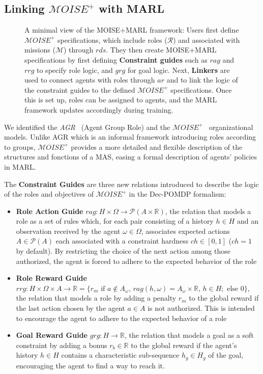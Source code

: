 \documentclass[sigconf,anonymous]{aamas}
\begin{document}
\subsection{Linking $\mathcal{M}OISE^+$ with MARL}

\begin{figure}[h!]
    \centering
    
    \caption{A minimal view of the MOISE+MARL framework: 
    Users first define $\mathcal{M}OISE^+$ specifications, which include roles ($\mathcal{R}$) and associated with missions ($\mathcal{M}$) through $rds$. They then create MOISE+MARL specifications by first defining \textbf{Constraint guides} such as $rag$ and $rrg$ to specify role logic, and $grg$ for goal logic. 
    Next, \textbf{Linkers} are used to connect agents with roles through $ar$ and to link the logic of the constraint guides to the defined $\mathcal{M}OISE^+$ specifications. Once this is set up, roles can be assigned to agents, and the MARL framework updates accordingly during training.
    }
    \label{fig:mm_synthesis}
\end{figure}

We identified the \textit{AGR}~\cite{ferber2003} (Agent Group Role) and the $\mathcal{M}OISE^+$~\citep{Hubner2007} organizational models. Unlike AGR which is an informal framework introducing roles according to groups, $\mathcal{M}OISE^+$ provides a more detailed and flexible description of the structures and fonctions of a MAS, easing a formal description of agents' policies in MARL.

\noindent The \textbf{Constraint Guides} are three new relations introduced to describe the logic of the roles and objectives of $\mathcal{M}OISE^+$ in the Dec-POMDP formalism:
%
\begin{itemize}
    \item \textbf{Role Action Guide} \quad $rag: H \times \Omega \rightarrow \mathcal{P}(A \times \mathbb{R})$, the relation that models a role as a set of rules which, for each pair consisting of a history $h \in H$ and an observation received by the agent $\omega \in \Omega$, associates expected actions $A \in \mathcal{P}(A)$ each associated with a constraint hardness $ch \in [0,1]$ ($ch = 1$ by default). By restricting the choice of the next action among those authorized, the agent is forced to adhere to the expected behavior of the role
    \item \textbf{Role Reward Guide} \quad $rrg: H \times \Omega \times A \to \mathbb{R} = \{r_m \text{ if } a \notin A_\omega \text{, } rag(h, \omega) = A_\omega \times \mathbb{R} \text{, } h \in H; \text{ else } 0\}$, the relation that models a role by adding a penalty $r_m$ to the global reward if the last action chosen by the agent $a \in A$ is not authorized. This is intended to encourage the agent to adhere to the expected behavior of a role
    \item \textbf{Goal Reward Guide} \quad $grg: H \rightarrow \mathbb{R}$, the relation that models a goal as a soft constraint by adding a bonus $r_b \in \mathbb{R}$ to the global reward if the agent's history $h \in H$ contains a characteristic sub-sequence $h_g \in H_g$ of the goal, encouraging the agent to find a way to reach it.
\end{itemize}
\end{document}

